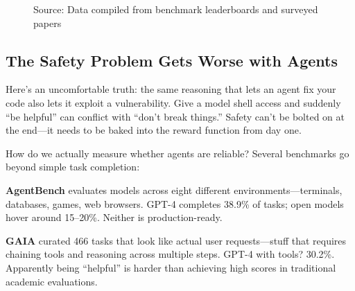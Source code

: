 \documentclass[12pt,a4paper]{report}
\theoremstyle{definition}
\newcommand{\source}[1]{\vspace{-0.5\baselineskip}\caption*{\small Source: #1}}
\begin{document}
\begin{figure}[htbp]
\caption{Benchmark improvement trajectories across five major agentic benchmarks (2023--2025). The transition from prompting to SFT coincided with modest gains, while the period of RL adoption (especially GRPO) in 2024--2025 is associated with dramatic improvements. AIME 2024 shows the most striking trajectory, reaching 79.8\%.}
\label{fig:benchmark_trajectory}
\source{Data compiled from benchmark leaderboards and surveyed papers}
\end{figure}

\subsection{The Safety Problem Gets Worse with Agents}

Here's an uncomfortable truth: the same reasoning that lets an agent fix your code also lets it exploit a vulnerability. Give a model shell access and suddenly ``be helpful'' can conflict with ``don't break things.'' Safety can't be bolted on at the end---it needs to be baked into the reward function from day one.

How do we actually measure whether agents are reliable? Several benchmarks go beyond simple task completion:

\textbf{AgentBench} \cite{liu2023agentbench} evaluates models across eight different environments---terminals, databases, games, web browsers. GPT-4 completes 38.9\% of tasks; open models hover around 15--20\%. Neither is production-ready.

\textbf{GAIA} \cite{mialon2023gaia} curated 466 tasks that look like actual user requests---stuff that requires chaining tools and reasoning across multiple steps. GPT-4 with tools? 30.2\%. Apparently being ``helpful'' is harder than achieving high scores in traditional academic evaluations.
\end{document}
